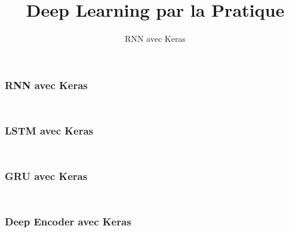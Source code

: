 \documentclass{formation}
\title{Deep Learning par la Pratique}
\subtitle{RNN avec Keras}
\begin{document}
\maketitle

\begin{frame}
  \frametitle{RNN avec Keras}
  \inputminted[linenos,fontsize=\small,bgcolor=pythonbg]{python}{code-illustration/tf-keras-rnn.py}
  \inputminted[linenos,fontsize=\small,bgcolor=returnbg]{python}{code-illustration/tf-keras-rnn.txt}
\end{frame}

\begin{frame}
  \frametitle{LSTM avec Keras}
  \inputminted[linenos,fontsize=\small,bgcolor=pythonbg]{python}{code-illustration/tf-keras-lstm.py}
  \inputminted[linenos,fontsize=\small,bgcolor=returnbg]{python}{code-illustration/tf-keras-lstm.txt}
\end{frame}

\begin{frame}
  \frametitle{GRU avec Keras}
  \inputminted[linenos,fontsize=\small,bgcolor=pythonbg]{python}{code-illustration/tf-keras-gru.py}
  \inputminted[linenos,fontsize=\small,bgcolor=returnbg]{python}{code-illustration/tf-keras-gru.txt}
\end{frame}

\begin{frame}
  \frametitle{Deep Encoder avec Keras}
  \inputminted[linenos,fontsize=\small,bgcolor=pythonbg]{python}{code-illustration/tf-keras-rnn-all-timestep.py}
  \inputminted[linenos,fontsize=\small,bgcolor=returnbg]{python}{code-illustration/tf-keras-rnn-all-timestep.txt}
\end{frame}
\end{document}
